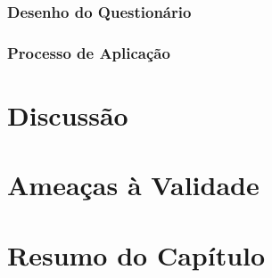 \subsubsection{Desenho do Questionário}
\label{ssub:sug_melhoria_desenho_questionario}


\subsubsection{Processo de Aplicação}
\label{ssub:processo_de_aplicação}


\section{Discussão}
\label{sec:sug_melhoria_discussao}

\section{Ameaças à Validade}
\label{sec:sug_melhoria_ameacas}

\section{Resumo do Capítulo}
\label{sec:sug_melhoria_resumo}
